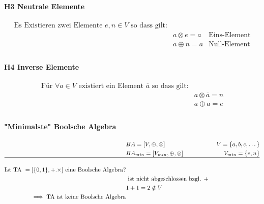 \documentclass[a4paper]{scrartcl}
\begin{document}
				\paragraph{H3 Neutrale Elemente}
				\begin{align*}
					\text{Es Existieren zwei Elemente } e,n \in V \text{ so dass gilt:}&\\
					&a \otimes e = a & \text{Eins-Element}\\
					&a \oplus n = a &\text{Null-Element}\\
				\end{align*}
				
				\paragraph{H4 Inverse Elemente}
				\begin{align*}
					\text{Für } \forall a \in V \text{ existiert ein Element } \overline{a} \text{ so dass gilt:}&\\
					&a \otimes \overline{a} = n \\
					&a \oplus \overline{a} = e\\
				\end{align*}
				
				\paragraph{"Minimalste" Boolsche Algebra}
				\begin{align*}
					&BA = [V, \oplus , \otimes ] & V = \{ a,b,c, \dots \} \\
					&BA_{min} = [V_{min}, \oplus , \otimes ] & V_{min} = \{e, n\}\\ \hline
					\\
					\text{Ist TA }= [ \{0,1\}, +. \times ] \text{ eine Boolsche Algebra?}\\
					&\text{ ist nicht abgeschlossen bzgl. + }\\
					&1 + 1 = 2 \notin V\\ 
					\implies \text{TA ist keine Boolsche Algebra} &\\
				\end{align*}
				
\end{document}
